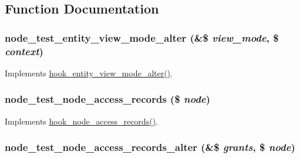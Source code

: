 \subsection{Function Documentation}
\hypertarget{node__test_8module_aa27dc29667a3f10904c21b8b4ffbea0e}{
\subsubsection[{node\_\-test\_\-entity\_\-view\_\-mode\_\-alter}]{\setlength{\rightskip}{0pt plus 5cm}node\_\-test\_\-entity\_\-view\_\-mode\_\-alter (\&\$ {\em view\_\-mode}, \/  \$ {\em context})}}
\label{node__test_8module_aa27dc29667a3f10904c21b8b4ffbea0e}
Implements \hyperlink{group__hooks_gaca4b0e0aba85f92344ccf941684f2272}{hook\_\-entity\_\-view\_\-mode\_\-alter()}. \hypertarget{node__test_8module_ab221632708d589efef84d438874fb943}{
\subsubsection[{node\_\-test\_\-node\_\-access\_\-records}]{\setlength{\rightskip}{0pt plus 5cm}node\_\-test\_\-node\_\-access\_\-records (\$ {\em node})}}
\label{node__test_8module_ab221632708d589efef84d438874fb943}
Implements \hyperlink{group__node__access_ga3fe7744d74446e40e9b9ad2a782b4269}{hook\_\-node\_\-access\_\-records()}. \hypertarget{node__test_8module_ab0d2902a1e4481b0258f4a8270cfd509}{
\subsubsection[{node\_\-test\_\-node\_\-access\_\-records\_\-alter}]{\setlength{\rightskip}{0pt plus 5cm}node\_\-test\_\-node\_\-access\_\-records\_\-alter (\&\$ {\em grants}, \/  \$ {\em node})}}
